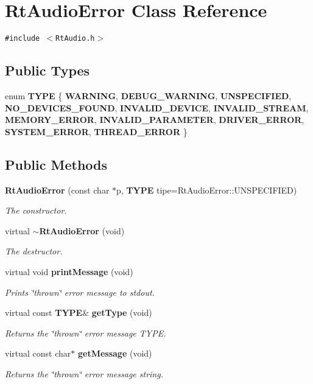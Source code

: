 \section{Rt\-Audio\-Error  Class Reference}
\label{classRtAudioError}
{\tt \#include $<$Rt\-Audio.h$>$}

\subsection*{Public Types}
\begin{CompactItemize}
\item 
enum {\bf TYPE} \{ {\bf WARNING}, 
{\bf DEBUG\_\-WARNING}, 
{\bf UNSPECIFIED}, 
{\bf NO\_\-DEVICES\_\-FOUND}, 
{\bf INVALID\_\-DEVICE}, 
{\bf INVALID\_\-STREAM}, 
{\bf MEMORY\_\-ERROR}, 
{\bf INVALID\_\-PARAMETER}, 
{\bf DRIVER\_\-ERROR}, 
{\bf SYSTEM\_\-ERROR}, 
{\bf THREAD\_\-ERROR}
 \}
\end{CompactItemize}
\subsection*{Public Methods}
\begin{CompactItemize}
\item 
{\bf Rt\-Audio\-Error} (const char $\ast$p, {\bf TYPE} tipe=Rt\-Audio\-Error::UNSPECIFIED)
\begin{CompactList}\small\item\em The constructor.\item\end{CompactList}\item 
virtual {\bf $\sim$Rt\-Audio\-Error} (void)
\begin{CompactList}\small\item\em The destructor.\item\end{CompactList}\item 
virtual void {\bf print\-Message} (void)
\begin{CompactList}\small\item\em Prints \char`\"{}thrown\char`\"{} error message to stdout.\item\end{CompactList}\item 
virtual const {\bf TYPE}\& {\bf get\-Type} (void)
\begin{CompactList}\small\item\em Returns the \char`\"{}thrown\char`\"{} error message TYPE.\item\end{CompactList}\item 
virtual const char$\ast$ {\bf get\-Message} (void)
\begin{CompactList}\small\item\em Returns the \char`\"{}thrown\char`\"{} error message string.\item\end{CompactList}\end{CompactItemize}
